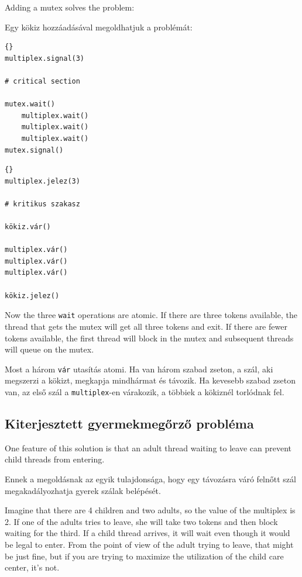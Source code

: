 \documentclass{book}
\begin{document}
Adding a mutex solves the problem:

Egy kökiz hozzáadásával megoldhatjuk a problémát:

\begin{lstlisting}[title={Child care solution (adult)}]{}
multiplex.signal(3)

# critical section

mutex.wait()
    multiplex.wait()
    multiplex.wait()
    multiplex.wait()
mutex.signal()
\end{lstlisting}

\begin{lstlisting}[title={Gyermekmegőrző megoldás (felnőtt)}]{}
multiplex.jelez(3)

# kritikus szakasz

kökiz.vár()

multiplex.vár()
multiplex.vár()
multiplex.vár()

kökiz.jelez()
\end{lstlisting}

Now the three {\tt wait} operations are atomic.  If there
are three tokens available, the thread that gets the mutex
will get all three tokens and exit.  If there are fewer
tokens available, the first thread will block in the mutex
and subsequent threads will queue on the mutex.

Most a három {\tt vár} utasítás atomi. Ha van három szabad
zseton, a szál, aki megszerzi a kökizt, megkapja mindhármat
és távozik. Ha kevesebb szabad zseton van, az első
szál a {\tt multiplex}-en várakozik, a többiek a kökiznél
torlódnak fel.

\subsection{Kiterjesztett gyermekmegőrző probléma}

One feature of this solution is that an adult thread waiting to leave
can prevent child threads from entering.

Ennek a megoldásnak az egyik tulajdonsága, hogy egy távozásra
váró felnőtt szál megakadályozhatja gyerek szálak belépését.

Imagine that there are 4 children and two adults, so the value of the
multiplex is 2.  If one of the adults tries to leave, she will take
two tokens and then block waiting for the third.  If a child thread
arrives, it will wait even though it would be legal to enter.
From the point of view of the adult trying to leave, that might
be just fine, but if you are trying to maximize the utilization
of the child care center, it's not.
\end{document}
